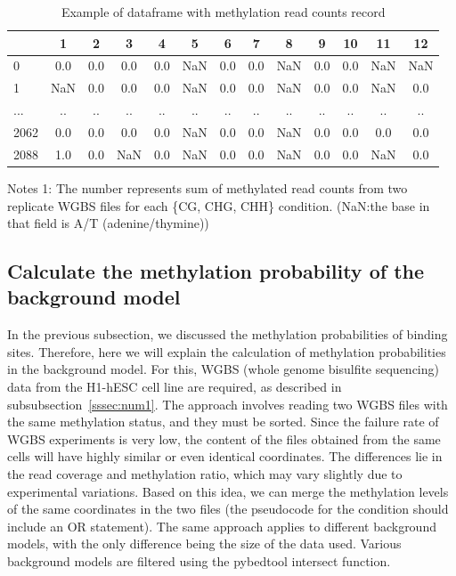 \documentclass{PHlab-thesis}
\begin{document}
\begin{table}[H]
	\centering
	\begin{tabular}{l*{12}{c}}
		\toprule
		         & 1 &  2&  3&4  &5&6&7&8&  9& 10 & 11&12\\
		\midrule
		
		0     &0.0  &0.0  &0.0  &0.0   &NaN  &0.0  &0.0   &NaN &0.0  &0.0   &NaN   &NaN\\
		1     &NaN   &0.0  &0.0  &0.0  &NaN  &0.0  &0.0   &NaN  &0.0 &0.0 &NaN   &0.0\\
		...   &.. &.. &.. &.. &.. &.. &.. &.. &.. &.. &.. &..\\
		
		2062   &0.0  &0.0  &0.0  &0.0  &NaN  &0.0  &0.0   &NaN  &0.0  &0.0   &0.0  &0.0\\
		2088 &1.0  &0.0   &NaN  &0.0   &NaN  &0.0  &0.0  &NaN  &0.0  &0.0   &NaN  &0.0\\
		\bottomrule
	\end{tabular}
	\begin{minipage}{14cm}
		\vspace{0.15cm}
		\footnotesize  Notes 1: The number represents sum of methylated read counts from two replicate WGBS files for each \{CG, CHG, CHH\} condition. (NaN:the base in that field is A/T (adenine/thymine)) 
	\end{minipage}
	\caption{Example of dataframe with methylation read counts record}
	\label{table:methylated}
\end{table}

\subsection{Calculate the methylation probability of the background model}
In the previous subsection, we discussed the methylation probabilities of binding sites. Therefore, here we will explain the calculation of methylation probabilities in the background model. For this, WGBS (whole genome bisulfite sequencing) data from the H1-hESC cell line are required, as described in subsubsection~\ref{sssec:num1}. The approach involves reading two WGBS files with the same methylation status, and they must be sorted. Since the failure rate of WGBS experiments is very low, the content of the files obtained from the same cells will have highly similar or even identical coordinates. The differences lie in the read coverage and methylation ratio, which may vary slightly due to experimental variations. Based on this idea, we can merge the methylation levels of the same coordinates in the two files (the pseudocode for the condition should include an OR statement). The same approach applies to different background models, with the only difference being the size of the data used. Various background models are filtered using the pybedtool intersect function.
\end{document}

